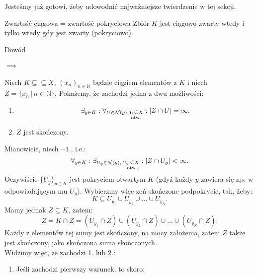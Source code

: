 \documentclass{article}
\numberwithin{defi}{section}
\numberwithin{defi}{section}
\newcommand{\N}{\mathbb{N}}
\newcommand{\oo}{\infty}
\newcommand{\Nau}{\mathcal{N}}
\newcommand{\subotw}{\underset{\clap{\scriptsize otw.}}{\subseteq}}
\newcommand{\ciag}[1]{(#1_{n})_{n \in \N}}
\begin{document}
    Jesteśmy już gotowi, żeby udowodnić najważniejsze twierdzenie w tej sekcji.

    \begin{twier}{Zwartość ciągowa = zwartość pokryciowa}
        Zbiór $K$ jest ciągowo zwarty wtedy i tylko wtedy gdy jest zwarty (pokryciowo).
    \end{twier}






    \begin{dow}{Dowód}
        \paragraph{$\implies$} Niech $K \subseteq \subseteq X$, $\ciag{x}$ będzie ciągiem elementów z $K$ i niech $Z  = \{ x_n \, | \, n \in \N \}$. Pokażemy, że zachodzi jedna z dwu możliwości: \begin{enumerate}
            \item \begin{equation*}
                \exists_{y \in K}: \forall_{U \in \Nau(y), \, U \subotw X}: | Z \cap U | = \oo. 
            \end{equation*}
            \item $Z$ jest skończony.
        \end{enumerate}  
        Mianowicie, niech $\neg 1.$, i.e.: \begin{equation*}
            \forall_{y \in K}: \exists_{U_y \in \Nau(y), \, U_y \, \subotw X}: | Z \cap U_y | < \oo.
        \end{equation*} Oczywiście $\{ U_y \}_{y \in K}$ jest pokryciem otwartym $K$ (gdyż każdy $y$ zawiera się np. w odpowiadającym mu $U_y$). Wybierzmy więc zeń skończone podpokrycie, tak, żeby: \begin{equation*}
            K \subseteq U_{y_1} \cup U_{y_2} \cup ... \cup U_{y_N}. 
        \end{equation*} Mamy jednak $Z \subseteq K$, zatem: \begin{equation}
            Z = K \cap Z = (U_{y_1} \cap Z) \cup (U_{y_2} \cap Z) \cup ... \cup (U_{y_N} \cap Z).
        \end{equation} Każdy z elementów tej sumy jest skończony, na mocy założenia, zatem $Z$ także jest skończony, jako skończona suma skończonych. \\
        Widzimy więc, że zachodzi 1. lub 2.: \begin{enumerate}
            \item Jeśli zachodzi pierwszy warunek, to skoro: \begin{equation*}

\end{equation*}
\end{enumerate}
\end{dow}
\end{document}
